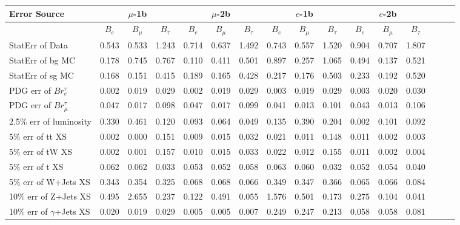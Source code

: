     
      \begin{tabular}{|l|ccc|ccc|ccc|ccc|ccc|}
      \hline
      Error Source & \multicolumn{3}{c|}{$\mu$-1b} & \multicolumn{3}{c|}{$\mu$-2b} & \multicolumn{3}{c|}{$e$-1b} & \multicolumn{3}{c|}{$e$-2b} \\
      \hline
                    & $B_e$ & $B_\mu$ & $B_\tau$ & $B_e$ & $B_\mu$ & $B_\tau$ & $B_e$ & $B_\mu$ & $B_\tau$ & $B_e$ & $B_\mu$ & $B_\tau$ \\
      \hline
      StatErr of Data                            & 0.543 & 0.533 & 1.243 & 0.714 & 0.637 & 1.492 & 0.743 & 0.557 & 1.520 & 0.904 & 0.707 & 1.807 \\ 
      StatErr of bg MC                           & 0.178 & 0.745 & 0.767 & 0.110 & 0.411 & 0.501 & 0.897 & 0.257 & 1.065 & 0.494 & 0.137 & 0.521 \\ 
      StatErr of sg MC                           & 0.168 & 0.151 & 0.415 & 0.189 & 0.165 & 0.428 & 0.217 & 0.176 & 0.503 & 0.233 & 0.192 & 0.520 \\ 
      \hline
      PDG err of $Br^\tau_e$                     & 0.002 & 0.019 & 0.029 & 0.002 & 0.019 & 0.029 & 0.003 & 0.019 & 0.029 & 0.003 & 0.020 & 0.030 \\ 
      PDG err of $Br^\tau_\mu$                   & 0.047 & 0.017 & 0.098 & 0.047 & 0.017 & 0.099 & 0.041 & 0.013 & 0.101 & 0.043 & 0.013 & 0.106 \\ 
      2.5$\%$ err of luminosity                  & 0.330 & 0.461 & 0.120 & 0.093 & 0.064 & 0.049 & 0.135 & 0.390 & 0.204 & 0.002 & 0.101 & 0.092 \\ 
      5$\%$ err of tt XS                         & 0.002 & 0.000 & 0.151 & 0.009 & 0.015 & 0.032 & 0.021 & 0.011 & 0.148 & 0.011 & 0.002 & 0.003 \\ 
      5$\%$ err of tW XS                         & 0.002 & 0.001 & 0.157 & 0.010 & 0.015 & 0.033 & 0.022 & 0.012 & 0.155 & 0.011 & 0.002 & 0.004 \\ 
      5$\%$ err of t XS                          & 0.062 & 0.062 & 0.033 & 0.053 & 0.052 & 0.058 & 0.063 & 0.060 & 0.032 & 0.052 & 0.054 & 0.040 \\ 
      5$\%$ err of W+Jets XS                     & 0.343 & 0.354 & 0.325 & 0.068 & 0.068 & 0.066 & 0.349 & 0.347 & 0.366 & 0.065 & 0.066 & 0.084 \\ 
      10$\%$ err of Z+Jets XS                    & 0.495 & 2.655 & 0.237 & 0.122 & 0.491 & 0.055 & 1.576 & 0.501 & 0.173 & 0.275 & 0.104 & 0.041 \\ 
      10$\%$ err of $\gamma$+Jets XS             & 0.020 & 0.019 & 0.029 & 0.005 & 0.005 & 0.007 & 0.249 & 0.247 & 0.213 & 0.058 & 0.058 & 0.081 \\ 

\end{tabular}
